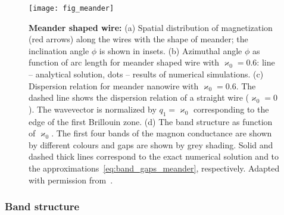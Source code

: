 \begin{figure}[t]
	\texttt{[image: fig\_meander]}
	\caption{\label{fig:meander}%
		\textbf{Meander shaped wire:} (a) Spatial distribution of magnetization (red arrows) along the wires with the shape of meander; the inclination angle $\phi$ is shown in insets. (b) Azimuthal angle $\phi$ as function of arc length for meander shaped wire with $\varkappa_0=0.6$: line -- analytical solution, dots -- results of numerical simulations. (c) Dispersion relation for meander nanowire with  $\varkappa_0=0.6$. The dashed line shows the dispersion relation of a straight wire ($\varkappa_0=0$). The wavevector is normalized by $q_1=\varkappa_0$ corresponding to the edge of the first Brillouin zone. (d) The band structure as function of $\varkappa_0$. The first four bands of the magnon conductance are shown by different colours and gaps are shown by grey shading. Solid and dashed thick lines correspond to the exact numerical solution and to the approximations~\eqref{eq:band_gaps_meander}, respectively. Adapted with permission from~\cite{Korniienko19b}.}
\end{figure}

\subsubsection{Band structure}

